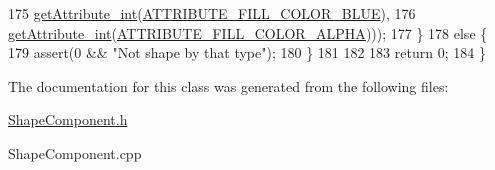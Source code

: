 \begin{DoxyCode}
175             \hyperlink{class_abstract_component_a16ac644f742683149b78d01b787eb3bd}{getAttribute\_int}(\hyperlink{_a_e___attributes_8h_a7c1ee03e64d7b6dd251b709f0130cc62}{ATTRIBUTE\_FILL\_COLOR\_BLUE}),
176             \hyperlink{class_abstract_component_a16ac644f742683149b78d01b787eb3bd}{getAttribute\_int}(\hyperlink{_a_e___attributes_8h_a66939dddc263c09ff273450168b31918}{ATTRIBUTE\_FILL\_COLOR\_ALPHA})));
177     \}
178     \textcolor{keywordflow}{else} \{
179         assert(0 && \textcolor{stringliteral}{"Not shape by that type"});
180     \}
181 
182 
183     \textcolor{keywordflow}{return} 0;
184 \}\end{DoxyCode}


The documentation for this class was generated from the following files\-:\begin{DoxyCompactItemize}
\item 
\hyperlink{_shape_component_8h}{Shape\-Component.\-h}\item 
Shape\-Component.\-cpp\end{DoxyCompactItemize}
